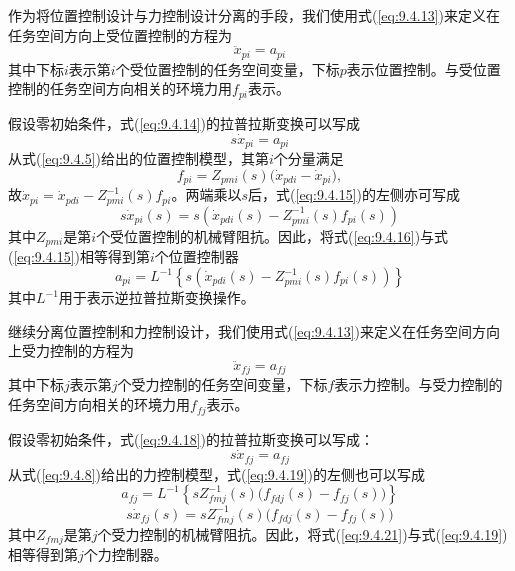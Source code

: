 \documentclass[12pt,a4paper]{ctexart}
\begin{document}
作为将位置控制设计与力控制设计分离的手段，我们使用式(\ref{eq:9.4.13})来定义在任务空间方向上受位置控制的方程为
\begin{equation}\label{eq:9.4.14}
\ddot{x}_{pi} = a_{pi}
\end{equation}
其中下标$i$表示第$i$个受位置控制的任务空间变量，下标$p$表示位置控制。与受位置控制的任务空间方向相关的环境力用$f_{pi}$表示。

假设零初始条件，式(\ref{eq:9.4.14})的拉普拉斯变换可以写成
\begin{equation}\label{eq:9.4.15}
s\dot{x}_{pi} = a_{pi}
\end{equation}
从式(\ref{eq:9.4.5})给出的位置控制模型，其第$i$个分量满足
\[
f_{pi} = Z_{pmi}(s)\bigl(\dot{x}_{pdi} - \dot{x}_{pi}\bigr),
\]
故$\dot{x}_{pi} = \dot{x}_{pdi} - Z_{pmi}^{-1}(s)f_{pi}$。两端乘以$s$后，式(\ref{eq:9.4.15})的左侧亦可写成
\begin{equation}\label{eq:9.4.16}
s\dot{x}_{pi}(s) = s\left(\dot{x}_{pdi}(s) - Z_{pmi}^{-1}(s)f_{pi}(s)\right)
\end{equation}
其中$Z_{pmi}$是第$i$个受位置控制的机械臂阻抗。因此，将式(\ref{eq:9.4.16})与式(\ref{eq:9.4.15})相等得到第$i$个位置控制器
\begin{equation}\label{eq:9.4.17}
a_{pi} = L^{-1}\!\left\{s\left(\dot{x}_{pdi}(s) - Z_{pmi}^{-1}(s)f_{pi}(s)\right)\right\}
\end{equation}
其中$L^{-1}$用于表示逆拉普拉斯变换操作。

继续分离位置控制和力控制设计，我们使用式(\ref{eq:9.4.13})来定义在任务空间方向上受力控制的方程为
\begin{equation}\label{eq:9.4.18}
\ddot{x}_{fj} = a_{fj}
\end{equation}
其中下标$j$表示第$j$个受力控制的任务空间变量，下标$f$表示力控制。与受力控制的任务空间方向相关的环境力用$f_{fj}$表示。

假设零初始条件，式(\ref{eq:9.4.18})的拉普拉斯变换可以写成：
\begin{equation}\label{eq:9.4.19}
s\dot{x}_{fj} = a_{fj}
\end{equation}
从式(\ref{eq:9.4.8})给出的力控制模型，式(\ref{eq:9.4.19})的左侧也可以写成
\begin{equation}\label{eq:9.4.20}
a_{fj} = L^{-1}\!\left\{ s Z_{fmj}^{-1}(s)\bigl(f_{fdj}(s) - f_{fj}(s)\bigr) \right\}
\end{equation}
\begin{equation}\label{eq:9.4.21}
s\dot{x}_{fj}(s) = s Z_{fmj}^{-1}(s)\bigl(f_{fdj}(s) - f_{fj}(s)\bigr)
\end{equation}
其中$Z_{fmj}$是第$j$个受力控制的机械臂阻抗。因此，将式(\ref{eq:9.4.21})与式(\ref{eq:9.4.19})相等得到第$j$个力控制器。
\end{document}
